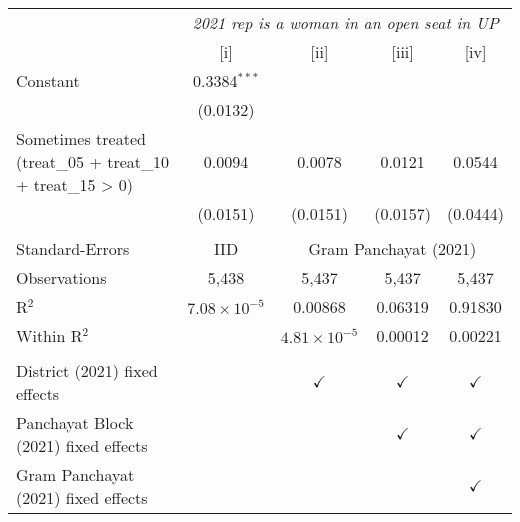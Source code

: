 
\begingroup
\centering
\begin{tabular}{lcccc}
   \toprule
    & \multicolumn{4}{c}{\textit{2021 rep is a woman in an open seat in UP}}\\
                                                                & [i]                   & [ii]                  & [iii]         & [iv]\\  
   \midrule 
   Constant                                                     & 0.3384$^{***}$        &                       &               &   \\   
                                                                & (0.0132)              &                       &               &   \\   
   Sometimes treated (treat\_05 + treat\_10 + treat\_15 > 0)    & 0.0094                & 0.0078                & 0.0121        & 0.0544\\   
                                                                & (0.0151)              & (0.0151)              & (0.0157)      & (0.0444)\\   
    \\
   Standard-Errors & IID & \multicolumn{3}{c}{Gram Panchayat (2021)} \\ 
   Observations                                                 & 5,438                 & 5,437                 & 5,437         & 5,437\\  
   R$^2$                                                        & $7.08\times 10^{-5}$  & 0.00868               & 0.06319       & 0.91830\\  
   Within R$^2$                                                 &                       & $4.81\times 10^{-5}$  & 0.00012       & 0.00221\\  
    \\
   District (2021) fixed effects                                &                       & $\checkmark$          & $\checkmark$  & $\checkmark$\\   
   Panchayat Block (2021) fixed effects                         &                       &                       & $\checkmark$  & $\checkmark$\\   
   Gram Panchayat (2021) fixed effects                          &                       &                       &               & $\checkmark$\\   
   \bottomrule
\end{tabular}
\par\endgroup


